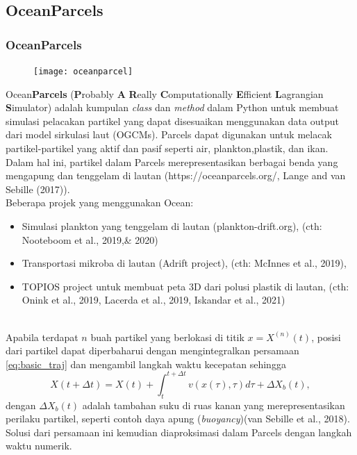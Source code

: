 \documentclass{beamer}
\begin{document}
\subsection{OceanParcels}
\begin{frame}[allowframebreaks]
	\frametitle{OceanParcels}	
	\begin{figure}[H]
		\centering
		\texttt{[image: oceanparcel]}\;\;
	\end{figure}
	\tiny Ocean\textbf{Parcels} (\textbf{P}robably \textbf{A} \textbf{R}eally \textbf{C}omputationally \textbf{E}fficient \textbf{L}agrangian \textbf{S}imulator) adalah kumpulan \textit{class} dan \textit{method} dalam Python untuk membuat simulasi pelacakan partikel yang dapat disesuaikan menggunakan data output dari model sirkulasi laut
	(OGCMs). Parcels dapat digunakan untuk melacak partikel-partikel yang aktif dan pasif seperti air, plankton,plastik, dan ikan. Dalam hal ini, partikel dalam Parcels merepresentasikan berbagai
	benda yang mengapung dan tenggelam di lautan (https://oceanparcels.org/, Lange and
	van Sebille (2017)). 
	\newpage
	\normalsize
	$\;$ \\
	Beberapa projek yang menggunakan Ocean: 
	\begin{itemize}
		\item Simulasi plankton yang tenggelam di lautan (plankton-drift.org), (cth: Nooteboom et al., 2019,\& 2020) 
		\item Transportasi mikroba di lautan (Adrift project), (cth: McInnes et al., 2019), 
		\item TOPIOS project untuk membuat peta 3D dari polusi plastik di lautan, (cth: Onink et al., 2019, Lacerda et al., 2019, Iskandar et al., 2021)
	\end{itemize}
	\newpage
	$\;$ \\
	Apabila terdapat $n$ buah partikel yang berlokasi di titik $x=X^{(n)}(t)$, posisi dari partikel dapat diperbaharui dengan mengintegralkan persamaan \ref{eq:basic_traj} dan mengambil langkah waktu kecepatan sehingga
	\begin{equation}\label{eq:traj}
		X(t+\Delta t) = X(t)+\int_{t}^{t+\Delta t}v(x(\tau),\tau)d\tau + \Delta X_b(t),
	\end{equation}
	dengan $\Delta X_b(t)$ adalah tambahan suku di ruas kanan yang merepresentasikan perilaku partikel, seperti contoh daya apung (\textit{buoyancy})(van Sebille et al., 2018). Solusi dari persamaan ini kemudian diaproksimasi dalam Parcels dengan langkah waktu numerik.

\end{frame}
\end{document}
